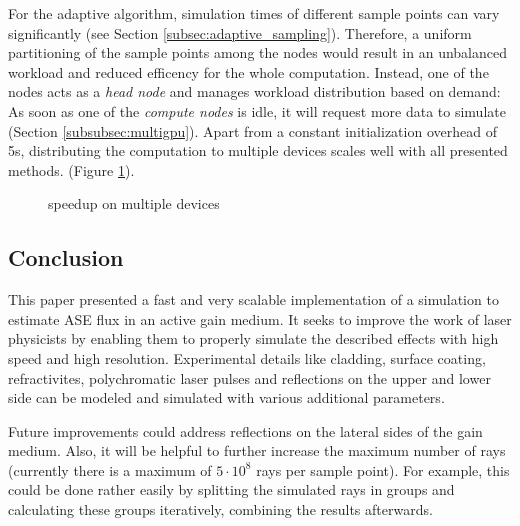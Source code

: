 For the adaptive algorithm, simulation times of different sample points can vary
significantly (see Section \ref{subsec:adaptive_sampling}). Therefore, a uniform
partitioning of the sample points among the nodes would result in an unbalanced
workload and reduced efficency for the whole computation. Instead, one of the
nodes acts as a \emph{head node} and manages workload distribution based on demand: As
soon as one of the \emph{compute nodes} is idle, it will request more data to
simulate (Section \ref{subsubsec:multigpu}).
Apart from a constant initialization overhead of 5s, distributing the computation to
multiple devices scales well with all presented methods. (Figure
\ref{plot:gpu_scaling}).
\begin{figure}[H]
  \centerline{
    }
  \caption{speedup on multiple devices}
  \label{plot:gpu_scaling}
\end{figure}

\subsection{Conclusion}
\label{subsec:conclusion}
This paper presented a fast and very scalable implementation of a simulation to
estimate ASE flux in an active gain medium. It seeks to improve the work of
laser physicists by enabling them to properly simulate the described effects
with high speed and high resolution. Experimental details like cladding, surface
coating, refractivites, polychromatic laser pulses and reflections on the upper
and lower side can be modeled and simulated with various additional parameters.

Future improvements could address reflections on the lateral sides of the gain
medium. Also, it will be helpful to further increase the maximum number of rays
(currently there is a maximum of $5\cdot10^8$ rays per sample point). For
example, this could be done rather easily by splitting the simulated rays in
groups and calculating these groups iteratively, combining the results
afterwards.


